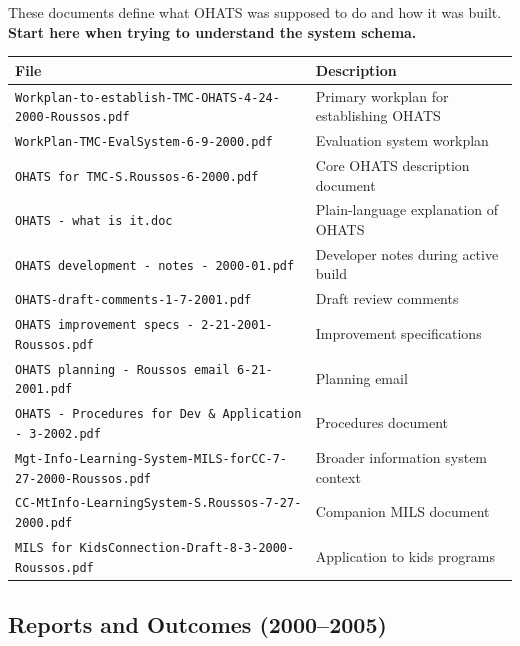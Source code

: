 \documentclass[12pt]{article}
\begin{document}
These documents define what OHATS was supposed to do and how it was built.
\textbf{Start here when trying to understand the system schema.}

\begin{center}
\begin{tabular}{lp{9cm}}
\toprule
File & Description \\
\midrule
\texttt{Workplan-to-establish-TMC-OHATS-4-24-2000-Roussos.pdf} & Primary workplan for establishing OHATS \\
\texttt{WorkPlan-TMC-EvalSystem-6-9-2000.pdf} & Evaluation system workplan \\
\texttt{OHATS for TMC-S.Roussos-6-2000.pdf} & Core OHATS description document \\
\texttt{OHATS - what is it.doc} & Plain-language explanation of OHATS \\
\texttt{OHATS development - notes - 2000-01.pdf} & Developer notes during active build \\
\texttt{OHATS-draft-comments-1-7-2001.pdf} & Draft review comments \\
\texttt{OHATS improvement specs - 2-21-2001-Roussos.pdf} & Improvement specifications \\
\texttt{OHATS planning - Roussos email 6-21-2001.pdf} & Planning email \\
\texttt{OHATS - Procedures for Dev \& Application - 3-2002.pdf} & Procedures document \\
\texttt{Mgt-Info-Learning-System-MILS-forCC-7-27-2000-Roussos.pdf} & Broader information system context \\
\texttt{CC-MtInfo-LearningSystem-S.Roussos-7-27-2000.pdf} & Companion MILS document \\
\texttt{MILS for KidsConnection-Draft-8-3-2000-Roussos.pdf} & Application to kids programs \\
\bottomrule
\end{tabular}
\end{center}

\subsection{Reports and Outcomes (2000--2005)}
\end{document}
